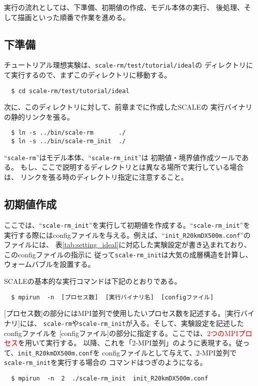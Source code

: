実行の流れとしては、下準備、初期値の作成、モデル本体の実行、
後処理、そして描画といった順番で作業を進める。

\subsection{下準備}
チュートリアル理想実験は、\verb|scale-rm/test/tutorial/ideal|の
ディレクトリにて実行するので、まずこのディレクトリに移動する。
\begin{verbatim}
  $ cd scale-rm/test/tutorial/ideal
\end{verbatim}
次に、このディレクトリに対して、前章までに作成したSCALEの
実行バイナリの静的リンクを張る。
\begin{verbatim}
  $ ln -s ../bin/scale-rm       ./
  $ ln -s ../bin/scale-rm_init  ./
\end{verbatim}
``\verb|scale-rm|''はモデル本体、``\verb|scale-rm_init|''は
初期値・境界値作成ツールである。
もし、ここで説明するディレクトリとは異なる場所で実行している場合は、
リンクを張る時のディレクトリ指定に注意すること。

\subsection{初期値作成}
ここでは、``\verb|scale-rm_init|''を実行して初期値を作成する。``\verb|scale-rm_init|''を
実行する際にはconfigファイルを与える。例えば、``\verb|init_R20kmDX500m.conf|''のファイルには、
表\ref{tab:setting_ideal}に対応した実験設定が書き込まれており、このconfigファイルの指示に
従って\verb|scale-rm_init|は大気の成層構造を計算し、ウォームバブルを設置する。


SCALEの基本的な実行コマンドは下記のとおりである。
\begin{verbatim}
  $ mpirun  -n  [プロセス数]  [実行バイナリ名]  [configファイル]
\end{verbatim}
[プロセス数]の部分にはMPI並列で使用したいプロセス数を記述する。[実行バイナリ]には、
\verb|scale-rm|や\verb|scale-rm_init|が入る。そして、実験設定を記述したconfigファイルを
[configファイル]の部分に指定する。ここでは、\textcolor{red}{2つのMPIプロセス}を用いて実行する。
以降、これを「2-MPI並列」のように表現する。従って、\verb|init_R20kmDX500m.conf|を
configファイルとして与えて、2-MPI並列で\verb|scale-rm_init|を実行する場合の
コマンドはつぎのようになる。
\begin{verbatim}
  $ mpirun  -n  2  ./scale-rm_init  init_R20kmDX500m.conf
\end{verbatim}

